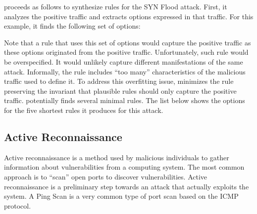 \documentclass[runningheads]{llncs}
\begin{document}
\tname{} proceeds as follows to synthesize rules for the SYN Flood
attack. First, it analyzes the positive traffic and extracts options
expressed in that traffic. For this example, it finds the following
set of options:

\begin{figure}[h]
  \vspace{-3ex}
  
  \vspace{-3ex}  
\end{figure}

Note that a rule that uses this set of options would capture the
positive traffic as these options originated from the positive
traffic. Unfortunately, such rule would be overspecified. It would
unlikely capture different manifestations of the same
attack. Informally, the rule includes ``too many'' characteristics of
the malicious traffic used to define it. To address this overfitting
issue, \tname{} minimizes the rule preserving the invariant that
plausible rules should only capture the positive traffic. \tname{}
potentially finds several minimal rules. The list below shows the
options for the five shortest rules it produces for this attack.


\subsection{Active Reconnaissance}

Active reconnaissance is a method used by malicious individuals to
gather information about vulnerabilities from a computing system. The
most common approach is to ``scan'' open ports to discover
vulnerabilities. Active reconnaissance is a preliminary step towards
an attack that actually exploits the system. A Ping Scan is a very
common type of port scan based on the ICMP
protocol. 



\subsection{}
\label{sec:content-example}
\end{document}
